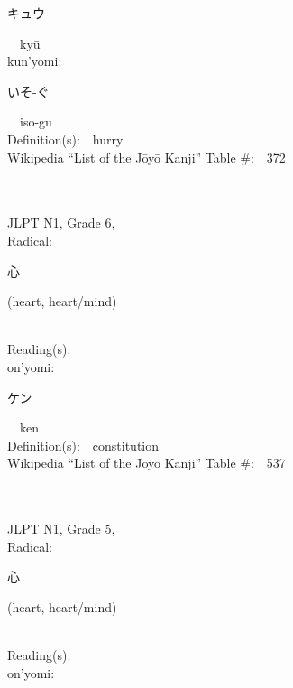 \begin{multicols}{2}
{\hspace*{2em}}{\begin{CJK}{UTF8}{min} キュウ \end{CJK}}\ \ ky\=u\ \ \\
{\hspace*{1em}}kun'yomi:\ \ \\
{\hspace*{2em}}{\begin{CJK}{UTF8}{min} いそ-ぐ \end{CJK}}\ \ iso-gu\ \ \\
Definition(s):\ \ hurry \\
Wikipedia ``List of the J\=oy\=o Kanji'' Table \#:\ \ 372 \\
\ \ \\
{\fontsize{34pt}{40pt}  }\ \ \\  %
{JLPT N1, Grade 6, \\Radical:\ \ {\begin{CJK}{UTF8}{min} 心 \end{CJK}} (heart, heart/mind) } \\
Reading(s):\ \ \\
{\hspace*{1em}}on'yomi:\ \ \\
{\hspace*{2em}}{\begin{CJK}{UTF8}{min} ケン \end{CJK}}\ \ ken\ \ \\
Definition(s):\ \ constitution \\
Wikipedia ``List of the J\=oy\=o Kanji'' Table \#:\ \ 537 \\
\ \ \\
{\fontsize{34pt}{40pt}  }\ \ \\  %
{JLPT N1, Grade 5, \\Radical:\ \ {\begin{CJK}{UTF8}{min} 心 \end{CJK}} (heart, heart/mind) } \\
Reading(s):\ \ \\
{\hspace*{1em}}on'yomi:\ \ \\

\end{multicols}
